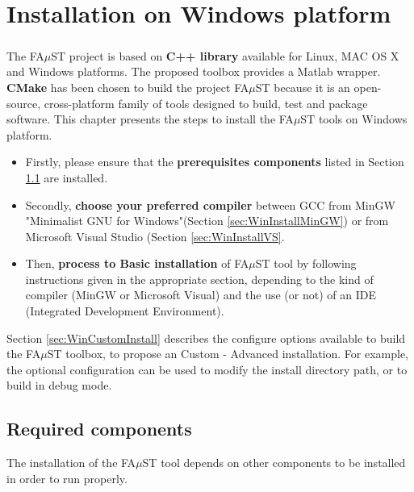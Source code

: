 \chapter{Installation on Windows platform}\label{sec:WinInstall}


\paragraph{}The FA$\mu$ST project is based on \textbf{C++ library} available for Linux, MAC OS X and Windows platforms. The proposed toolbox provides a Matlab wrapper. \textbf{CMake} has been chosen to build the project FA$\mu$ST because it is an open-source, cross-platform family of tools designed to build, test and package software. This chapter presents the steps to install the FA$\mu$ST tools on Windows platform.

\begin{itemize}
\item Firstly, please ensure that the \textbf{prerequisites components} listed in Section \ref{sec:WinRequired} are installed. 

\item Secondly, \textbf{choose your preferred compiler} between GCC from MinGW "Minimalist GNU for Windows"(Section \ref{sec:WinInstallMinGW}) or from Microsoft Visual Studio (Section \ref{sec:WinInstallVS}. 

\item Then, \textbf{process to Basic installation} of FA$\mu$ST tool by following instructions given in the appropriate section, depending to the kind of compiler (MinGW or Microsoft Visual) and the use (or not) of an IDE (Integrated Development Environment). 
\end{itemize}




Section \ref{sec:WinCustomInstall} describes the configure options available to build the FA$\mu$ST toolbox, to propose an Custom - Advanced installation. For example, the optional configuration can be used to modify the install directory path, or to build in debug mode.  


\section{Required components}\label{sec:WinRequired}
The installation of the FA$\mu$ST tool depends on other components to be installed in order to run properly. 


